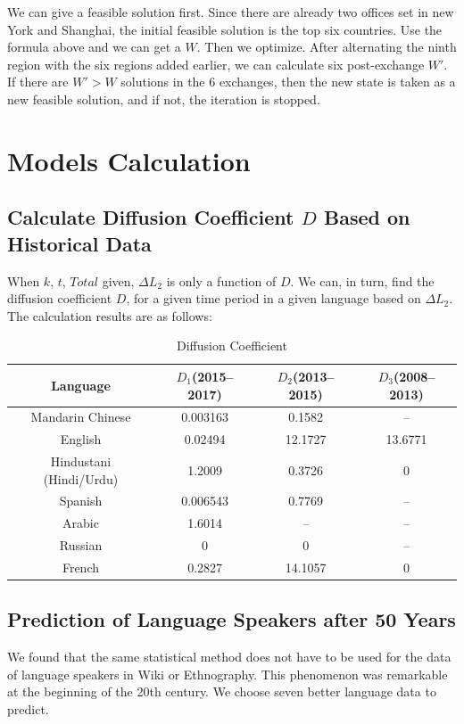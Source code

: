 \documentclass{mcmthesis}
\begin{document}
    We can give a feasible solution first.
    Since there are already two offices set in new York and Shanghai,
    the initial feasible solution is the top six countries.
    Use the formula above and we can get a $W$.
    Then we optimize.
    After alternating the ninth region with the six regions added earlier,
    we can calculate six post-exchange $W'$.
    If there are $W'>W$ solutions in the 6 exchanges,
    then the new state is taken as a new feasible solution,
    and if not, the iteration is stopped.



  \section{Models Calculation}%

    \subsection{Calculate Diffusion Coefficient $D$ Based on Historical Data}%
    When $k$, $t$, $Total$ given, $\Delta L_2$ is only a function of $D$.
    We can, in turn, find the diffusion coefficient $D$,
    for a given time period in a given language based on $\Delta L_2$.
    The calculation results are as follows:

    \begin{table}[h]
      \centering
      \caption{Diffusion Coefficient}

      \begin{tabular}{cccc}
        \toprule%
        Language&$D_1$(2015--2017)&$D_2$(2013--2015)&$D_3$(2008--2013)\\
        \midrule%
        Mandarin Chinese&0.003163&0.1582&--\\
        English&0.02494&12.1727&13.6771\\
        Hindustani (Hindi/Urdu)&1.2009&0.3726&0\\
        Spanish&0.006543&0.7769&--\\
        Arabic&1.6014&--&--\\
        Russian&0&0&--\\
        French&0.2827&14.1057&0\\
        \bottomrule%
      \end{tabular}
    \end{table}

    \subsection{Prediction of Language Speakers after 50 Years}
    We found that the same statistical method does not have to be used for the data of language speakers in Wiki or Ethnography.
    This phenomenon was remarkable at the beginning of the 20th century.
    We choose seven better language data to predict.
\end{document}
